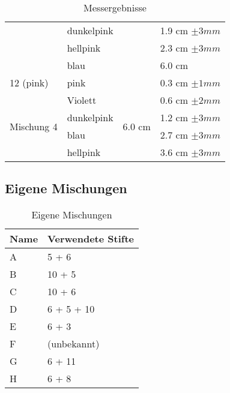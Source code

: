 \documentclass[11pt,paper=a4,final]{scrartcl}
\begin{document}
\begin{savenotes}
\begin{table}[ht]
\begin{tabular}{|l|l|l|l|}
      			& dunkelpink	&				& 1.9 cm \(\pm 3 mm \)	\\
      			& hellpink	&				& 2.3 cm \(\pm 3 mm \)	\\
      			& blau		&				& 6.0 cm		\\ \cline{1-2} \cline{4-4}
      12 (pink)		& pink		&				& 0.3 cm \(\pm 1 mm \)	\\ \hline
      \multirow{4}{*}{Mischung 4}
      			& Violett	& \multirow{4}{*}{6.0 cm }	& 0.6 cm \(\pm 2 mm \)	\\
      			& dunkelpink	&				& 1.2 cm \(\pm 3 mm \)	\\
			& blau		& 				& 2.7 cm \(\pm 3 mm \)	\\
      			& hellpink	& 				& 3.6 cm \(\pm 3 mm \)	\\ \hline
      	
    \end{tabular}
    \caption{Messergebnisse}
    \end{table}
\end{savenotes}

\subsection{Eigene Mischungen}
\begin{savenotes}
  \begin{table}[ht]
    \centering
    \begin{tabular}{|l|l|}
      \hline
      \bf Name & \bf Verwendete Stifte	\\ \hline
      A & 5 + 6 			\\ \hline
      B & 10 + 5			\\ \hline
      C & 10 + 6 			\\ \hline
      D & 6 + 5 + 10			\\ \hline
      E & 6 + 3				\\ \hline
      F & (unbekannt)			\\ \hline
      G & 6 + 11			\\ \hline
      H & 6 + 8				\\ \hline
    \end{tabular}
    \caption{Eigene Mischungen}
  \end{table}
\end{savenotes}
\end{document}
